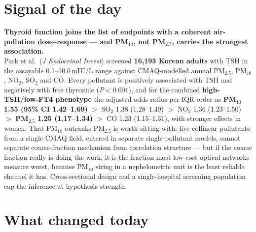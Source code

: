 \documentclass[10pt]{article}
\begin{document}
\vspace{6mm}

\section*{\sffamily\bfseries\color{Deep}Signal of the day}
\vspace{-1.5mm}{\color{Amber}\rule{\linewidth}{1.1pt}}\vspace{2.5mm}

\begin{keybox}
{\sffamily\bfseries\small\color{Deep}Thyroid function joins the list of endpoints with a
coherent air-pollution dose--response --- and PM$_{10}$, not PM$_{2.5}$, carries the
strongest association.}\\[1.4mm]
\footnotesize
Park et al.\ (\textit{J Endocrinol Invest}) screened \textbf{16{,}193 Korean adults} with
TSH in the assayable 0.1--10.0\,mIU/L range against CMAQ-modelled annual PM$_{2.5}$,
PM$_{10}$, NO$_2$, SO$_2$ and CO. Every pollutant is positively associated with TSH and
negatively with free thyroxine ($P<0.001$), and for the combined
\textbf{high-TSH/low-FT4 phenotype} the adjusted odds ratios per IQR order as
\textbf{PM$_{10}$ 1.55 (95\% CI 1.42--1.69)} $>$ SO$_2$ 1.38 (1.28--1.49) $>$ NO$_2$ 1.36
(1.23--1.50) $>$ \textbf{PM$_{2.5}$ 1.25 (1.17--1.34)} $>$ CO 1.23 (1.15--1.31), with
stronger effects in women. That PM$_{10}$ outranks PM$_{2.5}$ is worth sitting with: five
collinear pollutants from a single CMAQ field, entered in separate single-pollutant
models, cannot separate coarse-fraction mechanism from correlation structure --- but if
the coarse fraction really is doing the work, it is the fraction most low-cost optical
networks measure worst, because PM$_{10}$ sizing in a nephelometric unit is the least
reliable channel it has. Cross-sectional design and a single-hospital screening
population cap the inference at hypothesis strength.
\end{keybox}

\vspace{3mm}

\section*{\sffamily\bfseries\color{Deep}What changed today}
\vspace{-1.5mm}{\color{Amber}\rule{\linewidth}{1.1pt}}\vspace{2.5mm}
\end{document}
